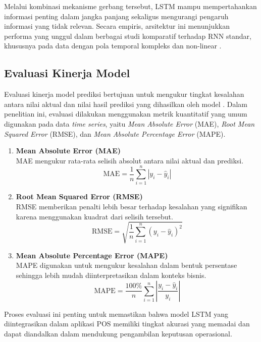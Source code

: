 Melalui kombinasi mekanisme gerbang tersebut, LSTM mampu mempertahankan informasi penting dalam jangka panjang sekaligus mengurangi pengaruh informasi yang tidak relevan. Secara empiris, arsitektur ini menunjukkan performa yang unggul dalam berbagai studi komparatif terhadap RNN standar, khususnya pada data dengan pola temporal kompleks dan non-linear \cite{Goodfellow2016}.

\subsection{Evaluasi Kinerja Model}
Evaluasi kinerja model prediksi bertujuan untuk mengukur tingkat kesalahan antara nilai aktual dan nilai hasil prediksi yang dihasilkan oleh model \cite{Prasetyo2023}. Dalam penelitian ini, evaluasi dilakukan menggunakan metrik kuantitatif yang umum digunakan pada data \textit{time series}, yaitu \textit{Mean Absolute Error} (MAE), \textit{Root Mean Squared Error} (RMSE), dan \textit{Mean Absolute Percentage Error} (MAPE).

\begin{enumerate}
    \item \textbf{Mean Absolute Error (MAE)} \\
    MAE mengukur rata-rata selisih absolut antara nilai aktual dan prediksi.
    \begin{equation}
        \text{MAE} = \frac{1}{n} \sum_{i=1}^{n} |y_i - \hat{y}_i|
    \end{equation}
    
    \item \textbf{Root Mean Squared Error (RMSE)} \\
    RMSE memberikan penalti lebih besar terhadap kesalahan yang signifikan karena menggunakan kuadrat dari selisih tersebut.
    \begin{equation}
        \text{RMSE} = \sqrt{\frac{1}{n} \sum_{i=1}^{n} (y_i - \hat{y}_i)^2}
    \end{equation}

    \item \textbf{Mean Absolute Percentage Error (MAPE)} \\
    MAPE digunakan untuk mengukur kesalahan dalam bentuk persentase sehingga lebih mudah diinterpretasikan dalam konteks bisnis.
    \begin{equation}
        \text{MAPE} = \frac{100\%}{n} \sum_{i=1}^{n} \left| \frac{y_i - \hat{y}_i}{y_i} \right|
    \end{equation}
\end{enumerate}

Proses evaluasi ini penting untuk memastikan bahwa model LSTM yang diintegrasikan dalam aplikasi POS memiliki tingkat akurasi yang memadai dan dapat diandalkan dalam mendukung pengambilan keputusan operasional.